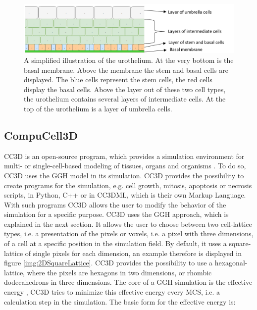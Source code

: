 \begin{figure}[th]
	\center
	\includegraphics[scale=0.3]{figures/Urothelium.png}
	\caption[A simplified illustration of the urothelium]{A simplified illustration of the urothelium. At the very bottom is the basal membrane. Above the membrane the stem and basal cells are displayed. The blue cells represent the stem cells, the red cells display the basal cells. Above the layer out of these two cell types, the urothelium contains several layers of intermediate cells. At the top of the urothelium is a layer of umbrella cells.}
	\label{img:physiology_urothelium}
\end{figure}

\subsection{CompuCell3D}
\ac{CC3D} is an open-source program, which provides a simulation environment for multi- or single-cell-based modeling of tissues, organs and organisms \cite{CC3D.org}. To do so, \ac{CC3D} uses the \ac{GGH} model in its simulation. 
CC3D provides the possibility to create programs for the simulation, e.g. cell growth, mitosis, apoptosis or necrosis scripts, in Python, C++ or in CC3DML, which is their own Markup Language. With such programs CC3D allows the user to modify the behavior of the simulation for a specific purpose.
CC3D uses the \ac{GGH} approach, which is explained in the next section. It allows the user to choose between two cell-lattice types, i.e. a presentation of the pixels or voxels, i.e. a pixel with three dimensions, of a cell at a specific position in the simulation field. By default, it uses a square-lattice of single pixels for each dimension, an example therefore is displayed in figure \ref{img:2DSquareLattice}. \ac{CC3D} provides the possibility to use a hexagonal-lattice, where the pixels are hexagons in two dimensions, or rhombic dodecahedrons in three dimensions.
The core of a \ac{GGH} simulation is the effective energy \cite{MaciejH.Swat2017}, \ac{CC3D} tries to minimize this effective energy every \ac{MCS}, i.e. a calculation step in the simulation. The basic form for the effective energy is:

